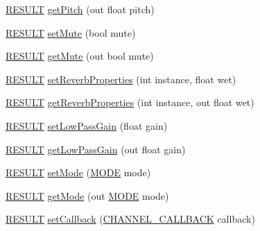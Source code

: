 \begin{DoxyCompactItemize}
\item 
\hyperlink{namespace_f_m_o_d_a305d1176ef3f8c8815861a60407ac33d}{R\+E\+S\+U\+LT} \hyperlink{class_f_m_o_d_1_1_channel_control_ac8d0b1ea451b36e8e74c6c3fabe82862}{get\+Pitch} (out float pitch)
\item 
\hyperlink{namespace_f_m_o_d_a305d1176ef3f8c8815861a60407ac33d}{R\+E\+S\+U\+LT} \hyperlink{class_f_m_o_d_1_1_channel_control_aebb5efb0f2405dbbc79047d4637a1fb2}{set\+Mute} (bool mute)
\item 
\hyperlink{namespace_f_m_o_d_a305d1176ef3f8c8815861a60407ac33d}{R\+E\+S\+U\+LT} \hyperlink{class_f_m_o_d_1_1_channel_control_a26ec2fe8b4c58b06968f92f9e7916c5d}{get\+Mute} (out bool mute)
\item 
\hyperlink{namespace_f_m_o_d_a305d1176ef3f8c8815861a60407ac33d}{R\+E\+S\+U\+LT} \hyperlink{class_f_m_o_d_1_1_channel_control_a7ef28a61646865e93a233ea1db6c8374}{set\+Reverb\+Properties} (int instance, float wet)
\item 
\hyperlink{namespace_f_m_o_d_a305d1176ef3f8c8815861a60407ac33d}{R\+E\+S\+U\+LT} \hyperlink{class_f_m_o_d_1_1_channel_control_ab4f7d46ef1e030c400aa4671b27fed8c}{get\+Reverb\+Properties} (int instance, out float wet)
\item 
\hyperlink{namespace_f_m_o_d_a305d1176ef3f8c8815861a60407ac33d}{R\+E\+S\+U\+LT} \hyperlink{class_f_m_o_d_1_1_channel_control_ad34908554d7cc6ffbefef37d0326b5ca}{set\+Low\+Pass\+Gain} (float gain)
\item 
\hyperlink{namespace_f_m_o_d_a305d1176ef3f8c8815861a60407ac33d}{R\+E\+S\+U\+LT} \hyperlink{class_f_m_o_d_1_1_channel_control_a83e04fc1b934bbcf8e1a458b41aa9429}{get\+Low\+Pass\+Gain} (out float gain)
\item 
\hyperlink{namespace_f_m_o_d_a305d1176ef3f8c8815861a60407ac33d}{R\+E\+S\+U\+LT} \hyperlink{class_f_m_o_d_1_1_channel_control_af7b48a996c84722bcdc4c6210ced099f}{set\+Mode} (\hyperlink{namespace_f_m_o_d_a94ab158a8314f5f4248f1aea55dbefa3}{M\+O\+DE} mode)
\item 
\hyperlink{namespace_f_m_o_d_a305d1176ef3f8c8815861a60407ac33d}{R\+E\+S\+U\+LT} \hyperlink{class_f_m_o_d_1_1_channel_control_aeeb78b0cacf1cc46b503bf82b0a355c0}{get\+Mode} (out \hyperlink{namespace_f_m_o_d_a94ab158a8314f5f4248f1aea55dbefa3}{M\+O\+DE} mode)
\item 
\hyperlink{namespace_f_m_o_d_a305d1176ef3f8c8815861a60407ac33d}{R\+E\+S\+U\+LT} \hyperlink{class_f_m_o_d_1_1_channel_control_a675ef7e3017ad231e4f83f509a3f5166}{set\+Callback} (\hyperlink{namespace_f_m_o_d_a3094c885d2c4a21049c65cb016a4cd3e}{C\+H\+A\+N\+N\+E\+L\+\_\+\+C\+A\+L\+L\+B\+A\+CK} callback)

\end{DoxyCompactItemize}

